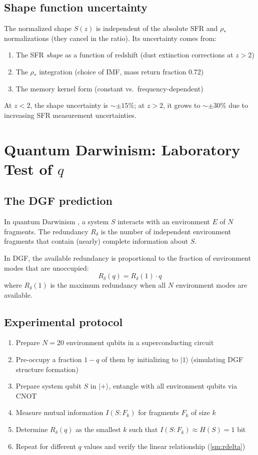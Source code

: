 \documentclass[12pt,a4paper]{article}
\begin{document}
\subsection{Shape function uncertainty}

The normalized shape $S(z)$ is independent of the absolute SFR and $\rho_*$ normalizations (they cancel in the ratio). Its uncertainty comes from:
\begin{enumerate}
\item The SFR {\it shape} as a function of redshift (dust extinction corrections at $z>2$)
\item The $\rho_*$ integration (choice of IMF, mass return fraction 0.72)
\item The memory kernel form (constant vs.\ frequency-dependent)
\end{enumerate}

At $z<2$, the shape uncertainty is $\sim\pm15\%$; at $z>2$, it grows to $\sim\pm30\%$ due to increasing SFR measurement uncertainties.

\section{Quantum Darwinism: Laboratory Test of $q$}

\subsection{The DGF prediction}

In quantum Darwinism \cite{zurek2009}, a system $S$ interacts with an environment $E$ of $N$ fragments. The redundancy $R_\delta$ is the number of independent environment fragments that contain (nearly) complete information about $S$.

In DGF, the available redundancy is proportional to the fraction of environment modes that are unoccupied:
\begin{equation}\label{sm:rdelta}
\boxed{R_\delta(q) = R_\delta(1)\cdot q}
\end{equation}
where $R_\delta(1)$ is the maximum redundancy when all $N$ environment modes are available.

\subsection{Experimental protocol}

\begin{enumerate}
\item Prepare $N=20$ environment qubits in a superconducting circuit
\item Pre-occupy a fraction $1-q$ of them by initializing to $|1\rangle$ (simulating DGF structure formation)
\item Prepare system qubit $S$ in $|+\rangle$, entangle with all environment qubits via CNOT
\item Measure mutual information $I(S:F_k)$ for fragments $F_k$ of size $k$
\item Determine $R_\delta(q)$ as the smallest $k$ such that $I(S:F_k)\approx H(S)=1$ bit
\item Repeat for different $q$ values and verify the linear relationship (\ref{sm:rdelta})
\end{enumerate}
\end{document}
